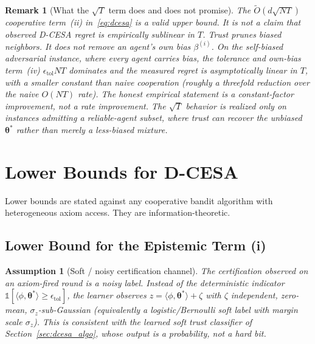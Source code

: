 \documentclass[11pt]{article}
\newtheorem{assumption}[theorem]{Assumption}
\newtheorem*{remark}{Remark}
\begin{document}
\begin{remark}[What the $\sqrt T$ term does and does not promise]\label{rem:dcesa_empirical}
The $\widetilde O(d\sqrt{NT})$ cooperative term~(ii)
in~\eqref{eq:dcesa} is a valid \emph{upper} bound. It is not a claim that
observed D-CESA regret is empirically sublinear in $T$.  Trust prunes
biased \emph{neighbors}. It does not remove an agent's \emph{own} bias
$\beta^{(i)}$.  On the self-biased adversarial instance, where every
agent carries bias, the tolerance and own-bias term~(iv)
$\epsilon_{\mathrm{tol}}NT$ dominates and the measured regret is
asymptotically \emph{linear} in $T$, with a smaller constant than naive
cooperation (roughly a threefold reduction over the naive $O(NT)$ rate).
The honest empirical statement is a constant-factor improvement, not a
rate improvement.  The $\sqrt T$ behavior is realized only on instances
admitting a reliable-agent subset, where trust can recover the unbiased
$\bm{\theta}^{\!*}$ rather than merely a less-biased mixture.
\end{remark}


\section{Lower Bounds for D-CESA}\label{sec:dcesa_lower}

Lower bounds are stated against any cooperative bandit algorithm
with heterogeneous axiom access. They are information-theoretic.

\subsection{Lower Bound for the Epistemic Term (i)}

\begin{assumption}[Soft / noisy certification channel]\label{ass:softcert}
The certification observed on an axiom-fired round is a \emph{noisy}
label. Instead of the deterministic indicator
$\mathbb{1}[\langle\phi,\bm{\theta}^{\!*}\rangle\geq\epsilon_{\mathrm{tol}}]$,
the learner observes $z=\langle\phi,\bm{\theta}^{\!*}\rangle+\zeta$ with
$\zeta$ independent, zero-mean, $\sigma_z$-sub-Gaussian (equivalently a
logistic/Bernoulli soft label with margin scale $\sigma_z$).  This is
consistent with the \emph{learned} soft trust classifier of
Section~\ref{sec:dcesa_algo}, whose output is a probability, not a hard
bit.
\end{assumption}
\end{document}

